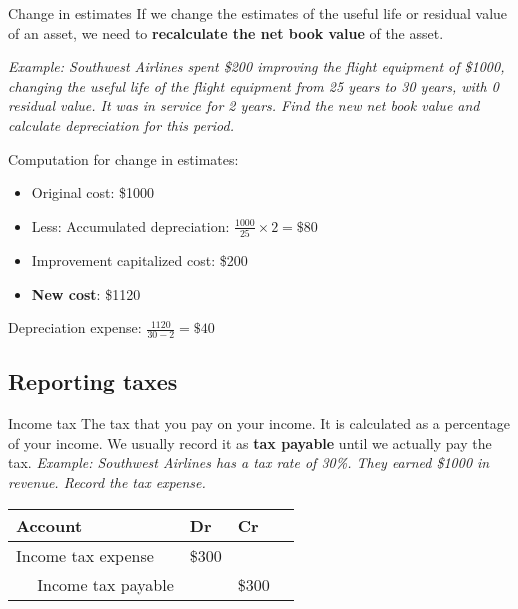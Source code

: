 \begin{knBox}
    {Change in estimates}
    If we change the estimates of the useful life or residual value of an asset, we need to \textbf{recalculate the net book value} of the asset.

    \tcblower

    \textit{Example: Southwest Airlines spent \$200 improving the flight equipment of \$1000, changing the useful life of the flight equipment from 25 years to 30 years, with 0 residual value. It was in service for 2 years. Find the new net book value and calculate depreciation for this period.}

    Computation for change in estimates:
    \begin{itemize}
        \item Original cost: \$1000
        \item Less: Accumulated depreciation: $\frac{1000}{25}\times2=\$80$
        \item Improvement capitalized cost: \$200
        \item \textbf{New cost}: \$1120
    \end{itemize}
    Depreciation expense: $\frac{1120}{30-2}=\$40$
\end{knBox}

\subsection{Reporting taxes}

\begin{definition}
    {Income tax}
    The tax that you pay on your income. It is calculated as a percentage of your income. We usually record it as \textbf{tax payable} until we actually pay the tax.
    \tcblower
    \textit{Example: Southwest Airlines has a tax rate of 30\%. They earned \$1000 in revenue. Record the tax expense.}

    \begin{tabular}{llll}
        \textbf{Account}           & \textbf{Dr} & \textbf{Cr} \\
        \hline
        Income tax expense         & \$300       &             \\
        $\quad$ Income tax payable &             & \$300       \\
    \end{tabular}
\end{definition}